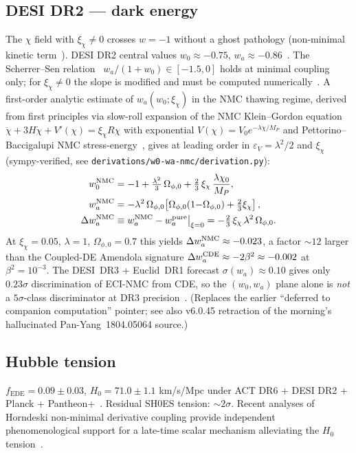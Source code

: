 \documentclass[reprint,amsmath,amssymb,aps,prd,superscriptaddress]{revtex4-2}
\providecommand{\1}{\mathbf{1}}
\begin{document}
\subsection{DESI DR2 --- dark energy}
The $\chi$ field with $\xi_\chi \neq 0$ crosses $w = -1$ without a ghost pathology (non-minimal kinetic term~\cite{BarceloVisser2000}). DESI DR2 central values $w_0 \approx -0.75$, $w_a \approx -0.86$~\cite{DESIDR2}. The Scherrer--Sen relation~\cite{ScherrerSen2008} $w_a / (1+w_0) \in [-1.5, 0]$ holds at minimal coupling only; for $\xi_\chi \neq 0$ the slope is modified and must be computed numerically~\cite{Sanchez2025}. A first-order analytic estimate of $w_a(w_0; \xi_\chi)$ in the NMC thawing regime, derived from first principles via slow-roll expansion of the NMC Klein--Gordon equation $\ddot{\chi} + 3H\dot{\chi} + V'(\chi) = \xi_\chi R\chi$ with exponential $V(\chi) = V_0 e^{-\lambda\chi/M_P}$ and Pettorino--Baccigalupi NMC stress-energy~\cite{PettorinoBaccigalupi2008}, gives at leading order in $\varepsilon_V = \lambda^2/2$ and $\xi_\chi$ (sympy-verified, see \texttt{derivations/w0-wa-nmc/derivation.py}):
\begin{align}
  w_0^{\rm NMC} &= -1 + \tfrac{\lambda^2}{3}\,\Omega_{\phi,0} + \tfrac{2}{3}\,\xi_\chi\,\frac{\lambda\chi_0}{M_P}, \\
  w_a^{\rm NMC} &= -\lambda^2\,\Omega_{\phi,0}\!\left[\Omega_{\phi,0}(1{-}\Omega_{\phi,0}) + \tfrac{2}{3}\xi_\chi\right], \\
  \Delta w_a^{\rm NMC} &\equiv w_a^{\rm NMC} - w_a^{\rm pure}\big|_{\xi=0} = -\tfrac{2}{3}\,\xi_\chi\,\lambda^2\,\Omega_{\phi,0}.
\end{align}
At $\xi_\chi = 0.05$, $\lambda = 1$, $\Omega_{\phi,0} = 0.7$ this yields $\Delta w_a^{\rm NMC} \approx -0.023$, a factor $\sim 12$ larger than the Coupled-DE Amendola signature $\Delta w_a^{\rm CDE} \approx -2\beta^2 \approx -0.002$ at $\beta^2 = 10^{-3}$. The DESI~DR3 + Euclid~DR1 forecast $\sigma(w_a) \approx 0.10$ gives only $0.23\sigma$ discrimination of ECI-NMC from CDE, so the $(w_0, w_a)$ plane alone is \emph{not} a $5\sigma$-class discriminator at DR3 precision~\cite{Sanchez2025}. (Replaces the earlier ``deferred to companion computation'' pointer; see also v6.0.45 retraction of the morning's hallucinated Pan-Yang~1804.05064 source.)

\subsection{Hubble tension}
$f_{\mathrm{EDE}} = 0.09 \pm 0.03$, $H_0 = 71.0 \pm 1.1$ km/s/Mpc under ACT DR6 + DESI DR2 + Planck + Pantheon+~\cite{PoulinSmith2026,Calabrese2025}. Residual SH0ES tension: $\sim 2\sigma$. Recent analyses of Horndeski non-minimal derivative coupling provide independent phenomenological support for a late-time scalar mechanism alleviating the $H_0$ tension~\cite{Oliveira2025NMC}.
\end{document}
